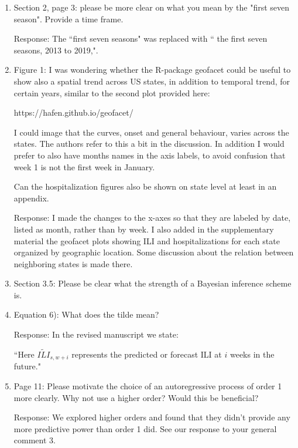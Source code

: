 \documentclass{article}
\newcommand{\spencer}[1]{{\color{red} Response: #1}}
\begin{document}
\begin{enumerate}[-]

\item Section 2, page 3: please be more clear on what you mean by the 
"first seven season". Provide a time frame.

\spencer{The ``first seven seasons" was replaced with 
`` the first seven seasons, 2013 to 2019,".} 

\item Figure 1: I was wondering whether the R-package geofacet could be useful to 
show also a spatial trend across US states, in addition to temporal trend, for 
certain years,  similar to the second plot provided here:

https://hafen.github.io/geofacet/

I could image that the curves, onset and general behaviour, varies across the 
states. The authors refer to this a bit in the discussion. In addition I would 
prefer to also have months names in the axis labels, to avoid confusion that 
week 1 is not the first week in January.

Can the hospitalization figures also be shown on state level at least in an appendix.

\spencer{I made the changes to the x-axes so that they are labeled by date, 
listed as month, rather than by week. I also added in the 
supplementary material the geofacet plots showing 
ILI and hospitalizations for each state organized by geographic location. Some
discussion about the relation between neighboring states is made there.}

\item Section 3.5: Please be clear what the strength of a Bayesian inference scheme is. 

\item Equation 6): What does the tilde mean?

\spencer{In the revised manuscript we state:

``Here $\widetilde{ILI}_{s,w + i}$ represents the 
predicted or forecast ILI at $i$ weeks in the future."}

\item Page 11: Please motivate the choice of an autoregressive process of order 1 
more clearly. Why not use a higher order? Would this be beneficial?


\spencer{We explored higher orders and found that they didn't provide any more
predictive power than order 1 did. See our response to your general comment 3.}


\end{enumerate}
\end{document}
